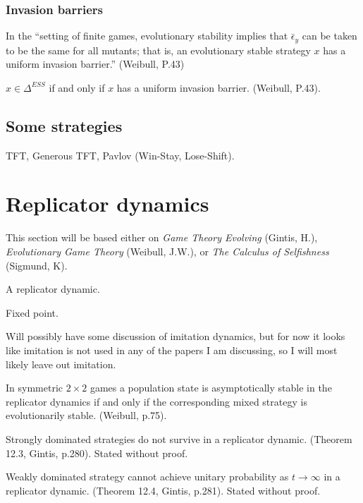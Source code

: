 \subsubsection{Invasion barriers}
In the ``setting of finite games, evolutionary stability implies that $\bar{\epsilon}_y$ can be taken to be the same for all mutants; that is, an evolutionary stable strategy $x$ has a uniform invasion barrier.'' (Weibull, P.43)
\begin{proposition}
$x \in \Delta^{ESS}$ if and only if $x$ has a uniform invasion barrier. (Weibull, P.43).
\end{proposition}


\subsection{Some strategies}
TFT, Generous TFT, Pavlov (Win-Stay, Lose-Shift).

\section{Replicator dynamics}
This section will be based either on \emph{Game Theory Evolving} (Gintis, H.), \emph{Evolutionary Game Theory} (Weibull, J.W.), or \emph{The Calculus of Selfishness} (Sigmund, K).

\begin{definition}
A replicator dynamic.
\end{definition}

\begin{definition}
Fixed point.
\end{definition}

Will possibly have some discussion of imitation dynamics, but for now it looks like imitation is not used in any of the papers I am discussing, so I will most likely leave out imitation.
\begin{theorem}
In symmetric $2 \times 2$ games a population state is asymptotically stable in the replicator dynamics if and only if the corresponding mixed strategy is evolutionarily stable. (Weibull, p.75).
\end{theorem}

\begin{theorem}
Strongly dominated strategies do not survive in a replicator dynamic. (Theorem 12.3, Gintis, p.280). Stated without proof.
\end{theorem}
\begin{theorem}
Weakly dominated strategy cannot achieve unitary probability as $t \rightarrow \infty$ in a replicator dynamic. (Theorem 12.4, Gintis, p.281). Stated without proof.
\end{theorem}

